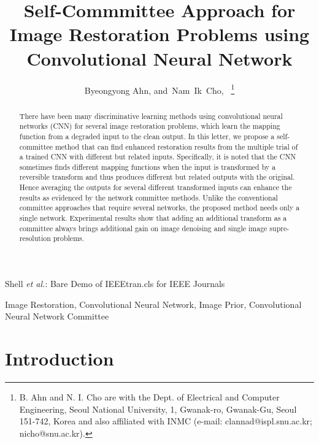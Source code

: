 \documentclass[journal]{IEEEtran}
\begin{document}
\title{Self-Commmittee Approach for Image Restoration Problems using 
Convolutional Neural Network}

\author{Byeongyong Ahn,
	and~Nam~Ik~Cho,~
\thanks{B. Ahn and N. I. Cho are with the Dept. of Electrical and Computer Engineering, Seoul National University,
	1, Gwanak-ro, Gwanak-Gu, Seoul 151-742, Korea and also
	affiliated with INMC
	(e-mail: clannad@ispl.snu.ac.kr; nicho@snu.ac.kr).}}

%
{Shell \MakeLowercase{\textit{et al.}}: Bare Demo of IEEEtran.cls for IEEE Journals}

\maketitle

\begin{abstract}
There have been many discriminative learning methods 
using convolutional neural networks (CNN) for several
image restoration problems, which learn the
mapping function from a degraded input to the clean output.
In this letter, we propose a self-committee method that can
find enhanced restoration results from the multiple trial of
a trained CNN with different but related inputs.
Specifically, it is noted that the CNN sometimes finds
different mapping functions when the input is transformed
by a reversible transform and thus produces different
but related outputs with the original. Hence averaging
the outputs for several different transformed inputs
can enhance the results as evidenced by the network
committee methods. Unlike the conventional committee approaches
that require several networks, the proposed method
needs only a single network.
Experimental results show that adding an additional transform as a committee
always brings additional gain on image denoising and single image
supre-resolution problems.
\end{abstract}

\begin{IEEEkeywords}
Image Restoration, Convolutional Neural Network, Image Prior, 
Convolutional Neural Network Committee
\end{IEEEkeywords}

\IEEEpeerreviewmaketitle

\section{Introduction}
  
\end{document}
